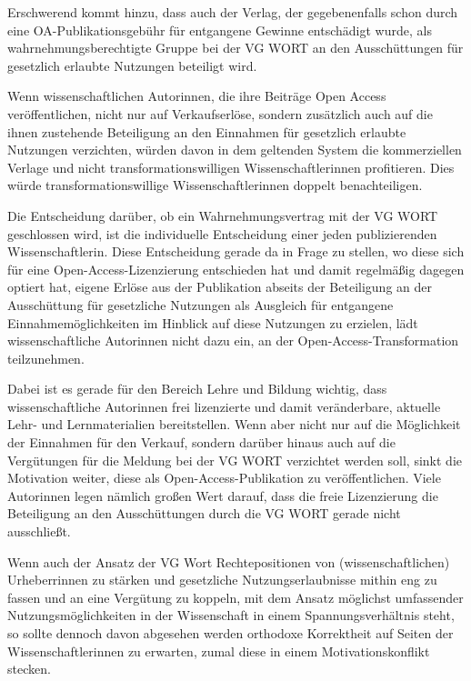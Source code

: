 \documentclass[a4paper,
fontsize=11pt,
oneside,
numbers=noperiodatend,
parskip=half-,
bibliography=totoc,
final
]{scrartcl}
\begin{document}
Erschwerend kommt hinzu, dass auch der Verlag, der gegebenenfalls schon
durch eine OA-Publikationsgebühr für entgangene Gewinne entschädigt
wurde, als wahrnehmungsberechtigte Gruppe bei der VG WORT an den
Ausschüttungen für gesetzlich erlaubte Nutzungen beteiligt wird.

Wenn wissenschaftlichen Autorinnen, die ihre Beiträge Open Access
veröffentlichen, nicht nur auf Verkaufserlöse, sondern zusätzlich auch
auf die ihnen zustehende Beteiligung an den Einnahmen für gesetzlich
erlaubte Nutzungen verzichten, würden davon in dem geltenden System die
kommerziellen Verlage und nicht transformationswilligen
Wissenschaftlerinnen profitieren. Dies würde transformationswillige
Wissenschaftlerinnen doppelt benachteiligen.

Die Entscheidung darüber, ob ein Wahrnehmungsvertrag mit der VG WORT
geschlossen wird, ist die individuelle Entscheidung einer jeden
publizierenden Wissenschaftlerin. Diese Entscheidung gerade da in Frage
zu stellen, wo diese sich für eine Open-Access-Lizenzierung entschieden
hat und damit regelmäßig dagegen optiert hat, eigene Erlöse aus der
Publikation abseits der Beteiligung an der Ausschüttung für gesetzliche
Nutzungen als Ausgleich für entgangene Einnahmemöglichkeiten im Hinblick
auf diese Nutzungen zu erzielen, lädt wissenschaftliche Autorinnen nicht
dazu ein, an der Open-Access-Transformation teilzunehmen.

Dabei ist es gerade für den Bereich Lehre und Bildung wichtig, dass
wissenschaftliche Autorinnen frei lizenzierte und damit veränderbare,
aktuelle Lehr- und Lernmaterialien bereitstellen. Wenn aber nicht nur
auf die Möglichkeit der Einnahmen für den Verkauf, sondern darüber
hinaus auch auf die Vergütungen für die Meldung bei der VG WORT
verzichtet werden soll, sinkt die Motivation weiter, diese als
Open-Access-Publikation zu veröffentlichen. Viele Autorinnen legen
nämlich großen Wert darauf, dass die freie Lizenzierung die Beteiligung
an den Ausschüttungen durch die VG WORT gerade nicht ausschließt.

Wenn auch der Ansatz der VG Wort Rechtepositionen von
(wissenschaftlichen) Urheberrinnen zu stärken und gesetzliche
Nutzungserlaubnisse mithin eng zu fassen und an eine Vergütung zu
koppeln, mit dem Ansatz möglichst umfassender Nutzungsmöglichkeiten in
der Wissenschaft in einem Spannungsverhältnis steht, so sollte dennoch
davon abgesehen werden orthodoxe Korrektheit auf Seiten der
Wissenschaftlerinnen zu erwarten, zumal diese in einem
Motivationskonflikt stecken.
\end{document}
